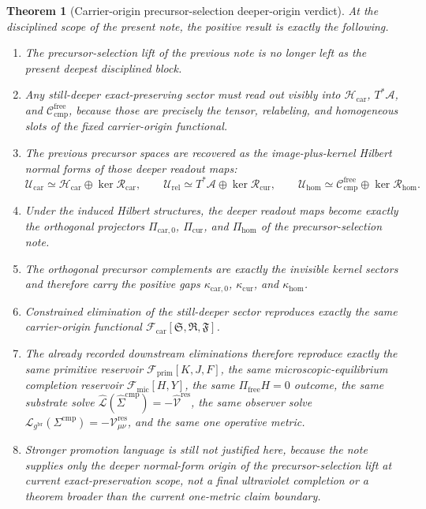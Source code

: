 \documentclass[11pt]{article}
\newcommand{\Sub}{\mathcal A}
\newcommand{\ObserverMetric}{g^{\mathrm{br}}}
\newcommand{\CompShift}{\Sigma^{\mathrm{cmp}}}
\newcommand{\CompLift}{\widehat\Sigma^{\mathrm{cmp}}}
\newcommand{\ResidualCore}{\mathcal V_{\mu\nu}^{\mathrm{res}}}
\newcommand{\ResidualLift}{\widehat{\mathcal V}^{\mathrm{res}}}
\newcommand{\SubReducedEin}{\widehat{\mathcal L}}
\newcommand{\GaugeAux}{Y}
\newcommand{\ReducedEin}{\mathcal L_{\ObserverMetric}}
\newcommand{\CompFree}{\mathscr C_{\mathrm{cmp}}^{\mathrm{free}}}
\newcommand{\MicFunctional}{\mathscr F_{\mathrm{mic}}}
\newcommand{\PrimFunctional}{\mathscr F_{\mathrm{prim}}}
\newcommand{\CarrierFunctional}{\mathscr F_{\mathrm{car}}}
\newcommand{\PrimStrain}{K}
\newcommand{\PrimNeutral}{J}
\newcommand{\PrimFree}{F}
\newcommand{\CarrierClass}{\mathscr H_{\mathrm{car}}}
\newcommand{\CarrierSeed}{\mathfrak S}
\newcommand{\RelabelSeed}{\mathfrak R}
\newcommand{\FreeSeed}{\mathfrak F}
\newcommand{\PreTensorClass}{\mathscr U_{\mathrm{car}}}
\newcommand{\PreRelabelClass}{\mathscr U_{\mathrm{rel}}}
\newcommand{\PreFreeClass}{\mathscr U_{\mathrm{hom}}}
\newcommand{\PreCarProj}{\Pi_{\mathrm{car},0}}
\newcommand{\CurrentProj}{\Pi_{\mathrm{cur}}}
\newcommand{\FreeReadProj}{\Pi_{\mathrm{hom}}}
\newcommand{\PreCarGap}{\kappa_{\mathrm{car},0}}
\newcommand{\CurrentGap}{\kappa_{\mathrm{cur}}}
\newcommand{\HomGap}{\kappa_{\mathrm{hom}}}
\newcommand{\CarRead}{\mathcal R_{\mathrm{car}}}
\newcommand{\CurRead}{\mathcal R_{\mathrm{cur}}}
\newcommand{\HomRead}{\mathcal R_{\mathrm{hom}}}
\newtheorem{theorem}{Theorem}
\begin{document}
\begin{theorem}[Carrier-origin precursor-selection deeper-origin verdict]
\label{thm:verdict}
At the disciplined scope of the present note, the positive result is exactly the following.
\begin{enumerate}
    \item The precursor-selection lift of the previous note is no longer left as the present deepest disciplined block.
    \item Any still-deeper exact-preserving sector must read out visibly into \(\CarrierClass\), \(T^*\Sub\), and \(\CompFree\), because those are precisely the tensor, relabeling, and homogeneous slots of the fixed carrier-origin functional.
    \item The previous precursor spaces are recovered as the image-plus-kernel Hilbert normal forms of those deeper readout maps:
    \[
    \PreTensorClass\simeq \CarrierClass\oplus \ker\CarRead,
    \qquad
    \PreRelabelClass\simeq T^*\Sub\oplus \ker\CurRead,
    \qquad
    \PreFreeClass\simeq \CompFree\oplus \ker\HomRead.
    \]
    \item Under the induced Hilbert structures, the deeper readout maps become exactly the orthogonal projectors \(\PreCarProj\), \(\CurrentProj\), and \(\FreeReadProj\) of the precursor-selection note.
    \item The orthogonal precursor complements are exactly the invisible kernel sectors and therefore carry the positive gaps \(\PreCarGap\), \(\CurrentGap\), and \(\HomGap\).
    \item Constrained elimination of the still-deeper sector reproduces exactly the same carrier-origin functional \(\CarrierFunctional[\CarrierSeed,\RelabelSeed,\FreeSeed]\).
    \item The already recorded downstream eliminations therefore reproduce exactly the same primitive reservoir \(\PrimFunctional[\PrimStrain,\PrimNeutral,\PrimFree]\), the same microscopic-equilibrium completion reservoir \(\MicFunctional[H,\GaugeAux]\), the same \(\Pi_{\mathrm{free}}H=0\) outcome, the same substrate solve \(\SubReducedEin(\CompLift)=-\ResidualLift\), the same observer solve \(\ReducedEin(\CompShift)=-\ResidualCore\), and the same one operative metric.
    \item Stronger promotion language is still not justified here, because the note supplies only the deeper normal-form origin of the precursor-selection lift at current exact-preservation scope, not a final ultraviolet completion or a theorem broader than the current one-metric claim boundary.
\end{enumerate}
\end{theorem}
\end{document}
